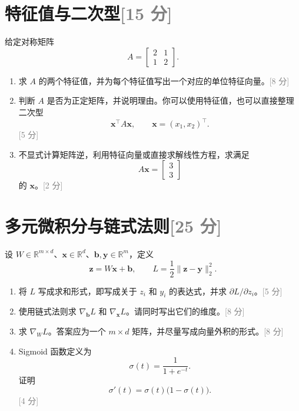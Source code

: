 \documentclass[11pt,a4paper]{article}
\newcommand{\R}{\mathbb{R}}
\newcommand{\grad}{\nabla}
\newcommand{\points}[1]{\hfill\textcolor{gray}{[#1 分]}}
\begin{document}
\section{特征值与二次型\texorpdfstring{\points{15}}{（15 分）}}

给定对称矩阵
\[
    A=\begin{bmatrix}2&1\\1&2\end{bmatrix}.
\]

\begin{enumerate}
    \item 求 $A$ 的两个特征值，并为每个特征值写出一个对应的单位特征向量。\points{8}

    \item 判断 $A$ 是否为正定矩阵，并说明理由。你可以使用特征值，也可以直接整理二次型
    \[
        \bm x^\top A\bm x,\qquad \bm x=(x_1,x_2)^\top.
    \]
    \points{5}

    \item 不显式计算矩阵逆，利用特征向量或直接求解线性方程，求满足
    \[
        A\bm x=\begin{bmatrix}3\\3\end{bmatrix}
    \]
    的 $\bm x$。\points{2}
\end{enumerate}

\section{多元微积分与链式法则\texorpdfstring{\points{25}}{（25 分）}}

设 $W\in\R^{m\times d}$、$\bm x\in\R^d$、$\bm b,\bm y\in\R^m$，定义
\[
    \bm z=W\bm x+\bm b,
    \qquad
    L=\frac{1}{2}\lVert\bm z-\bm y\rVert_2^2.
\]

\begin{enumerate}
    \item 将 $L$ 写成求和形式，即写成关于 $z_i$ 和 $y_i$ 的表达式，并求 $\partial L/\partial z_i$。\points{5}

    \item 使用链式法则求 $\grad_{\bm b}L$ 和 $\grad_{\bm x}L$。请同时写出它们的维度。\points{8}

    \item 求 $\grad_W L$。答案应为一个 $m\times d$ 矩阵，并尽量写成向量外积的形式。\points{8}

    \item Sigmoid 函数定义为
    \[
        \sigma(t)=\frac{1}{1+e^{-t}}.
    \]
    证明
    \[
        \sigma'(t)=\sigma(t)\bigl(1-\sigma(t)\bigr).
    \]
    \points{4}
\end{enumerate}
\end{document}
